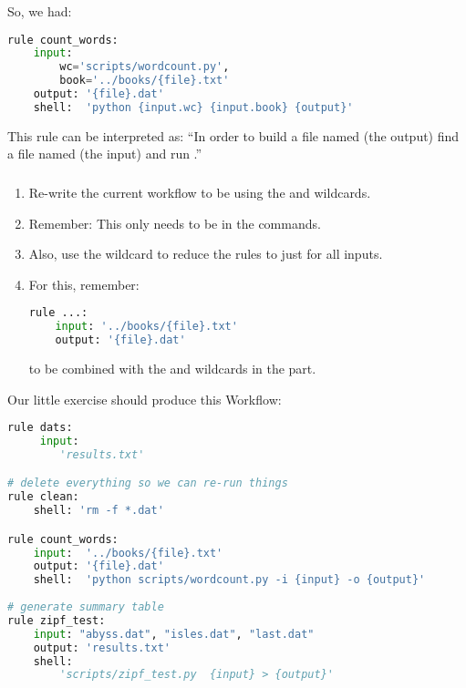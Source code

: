 \begin{frame}[fragile]
  So, we had:
    \begin{lstlisting}[language=Python,style=Python]
  rule count_words:
    input:
        wc='scripts/wordcount.py',
        book='../books/{file}.txt'
    output: '{file}.dat'
    shell:  'python {input.wc} {input.book} {output}'   
    \end{lstlisting}
    \begin{block}{This rule can be interpreted as:}
``In order to build a file named  (the output) find a file named  (the input) and run .''
  \end{block}
\end{frame}

\begin{frame}[fragile]
  \frametitle{}
  \begin{enumerate}
   \item Re-write the current workflow to be using the  and  wildcards.
   \item Remember: This only needs to be in the  commands.
   \item Also, use the  wildcard to reduce the  rules to just  for all inputs.
   \item For this, remember:
         \begin{lstlisting}[language=Python,style=Python]
rule ...:
    input: '../books/{file}.txt'
    output: '{file}.dat'
         \end{lstlisting}
         to be combined with the  and  wildcards in the  part.
  \end{enumerate}
\end{frame}


\begin{frame}[fragile]
Our little exercise should produce this Workflow:
      \begin{lstlisting}[language=Python,style=Python, basicstyle=\tiny]
rule dats:
     input:
        'results.txt'

# delete everything so we can re-run things
rule clean:
    shell: 'rm -f *.dat'

rule count_words:
    input:  '../books/{file}.txt'
    output: '{file}.dat'
    shell:  'python scripts/wordcount.py -i {input} -o {output}'
    
# generate summary table
rule zipf_test:
    input: "abyss.dat", "isles.dat", "last.dat"
    output: 'results.txt'
    shell:  
        'scripts/zipf_test.py  {input} > {output}'
      \end{lstlisting}

\end{frame}
